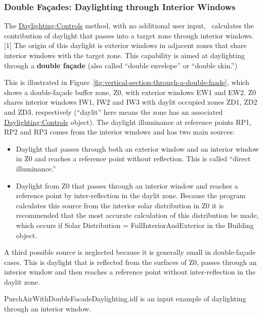 \subsubsection{Double Façades: Daylighting through Interior Windows}\label{double-fauxe7ades-daylighting-through-interior-windows}

The \hyperref[daylightingcontrols-000]{Daylighting:Controls} method, with no additional user input,~ calculates the contribution of daylight that passes into a target zone through interior windows.{[}1{]} The origin of this daylight is exterior windows in adjacent zones that share interior windows with the target zone. This capability is aimed at daylighting through a \textbf{double façade} (also called ``double envelope'' or ``double skin.'')

This is illustrated in Figure~\ref{fig:vertical-section-through-a-double-faade}, which shows a double-façade buffer zone, Z0, with exterior windows EW1 and EW2. Z0 shares interior windows IW1, IW2 and IW3 with daylit occupied zones ZD1, ZD2 and ZD3, respectively (``daylit'' here means the zone has an associated \hyperref[daylightingcontrols-000]{Daylighting:Controls} object). The daylight illuminance at reference points RP1, RP2 and RP3 comes from the interior windows and has two main sources:

\begin{itemize}
  \item
    Daylight that passes through both an exterior window and an interior window in Z0 and reaches a reference point without reflection. This is called ``direct illuminance.''
  \item
    Daylight from Z0 that passes through an interior window and reaches a reference point by inter-reflection in the daylit zone. Because the program calculates this source from the interior solar distribution in Z0 it is recommended that the most accurate calculation of this distribution be made, which occurs if Solar Distribution = FullInteriorAndExterior in the Building object.
\end{itemize}

A third possible source is neglected because it is generally small in double-façade cases. This is daylight that is reflected from the surfaces of Z0, passes through an interior window and then reaches a reference point without inter-reflection in the daylit zone.

PurchAirWithDoubleFacadeDaylighting.idf is an input example of daylighting through an interior window.

